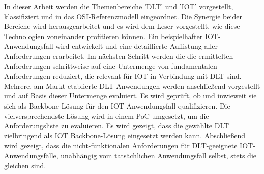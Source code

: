 \documentclass[
    ngerman,american
    ]{scrartcl}
\newcommand{\lang}{de}
\begin{document}
\begin{description}[style=unboxed]
	\item [\questionThree{\lang}]
	In dieser Arbeit werden die Themenbereiche 'DLT' und 'IOT' vorgestellt, klassifiziert und in das OSI-Referenzmodell eingeordnet. Die Synergie beider Bereiche wird herausgearbeitet und es wird dem Leser vorgestellt, wie diese Technologien voneinander profitieren können. Ein beispielhafter IOT-Anwendungsfall wird entwickelt und eine detaillierte Auflistung aller Anforderungen erarbeitet. Im nächsten Schritt werden die die ermittelten Anforderungen schrittweise auf eine Untermenge von fundamentalen Anforderungen reduziert, die relevant für IOT in Verbindung mit DLT sind. Mehrere, am Markt etablierte DLT Anwendungen werden anschließend vorgestellt und auf Basis dieser Untermenge evaluiert. Es wird geprüft, ob und inwieweit sie sich als Backbone-Lösung für den IOT-Anwendungsfall qualifizieren. Die vielversprechendste Lösung wird in einem PoC umgesetzt, um die Anforderungsliste zu evaluieren. Es wird gezeigt, dass die gewählte DLT zielbringend als IOT Backbone-Lösung eingesetzt werden kann. Abschließend wird gezeigt, dass die nicht-funktionalen Anforderungen für DLT-geeignete IOT-Anwendungsfälle, unabhängig vom tatsächlichen Anwendungsfall selbst, stets die gleichen sind.



\end{description}
\end{document}
